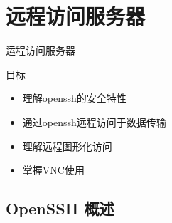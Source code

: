 \section{远程访问服务器}

\begin{frame}{运程访问服务器}

目标
\begin{itemize}
\item 理解openssh的安全特性
\item 通过openssh远程访问于数据传输
\item 理解远程图形化访问
\item 掌握VNC使用
\end{itemize}

\end{frame} 
\subsection{OpenSSH 概述}



